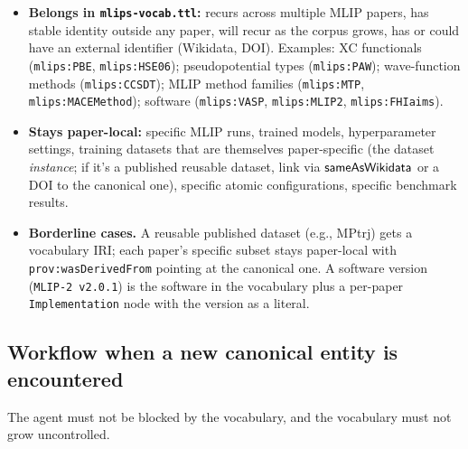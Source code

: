 \begin{itemize}
\item \textbf{Belongs in \texttt{mlips-vocab.ttl}:}
  recurs across multiple MLIP papers, has stable identity outside
  any paper, will recur as the corpus grows, has or could have an
  external identifier (Wikidata, DOI). Examples: XC functionals
  (\texttt{mlips:PBE}, \texttt{mlips:HSE06}); pseudopotential
  types (\texttt{mlips:PAW}); wave-function methods
  (\texttt{mlips:CCSDT}); MLIP method families
  (\texttt{mlips:MTP}, \texttt{mlips:MACEMethod}); software
  (\texttt{mlips:VASP}, \texttt{mlips:MLIP2}, \texttt{mlips:FHIaims}).

\item \textbf{Stays paper-local:}
  specific MLIP runs, trained models, hyperparameter settings,
  training datasets that are themselves paper-specific (the
  dataset \emph{instance}; if it's a published reusable dataset,
  link via $\mathsf{sameAsWikidata}$ or a DOI to the canonical
  one), specific atomic configurations, specific benchmark
  results.

\item \textbf{Borderline cases.}
  A reusable published dataset (e.g., MPtrj) gets a vocabulary
  IRI; each paper's specific subset stays paper-local with
  \texttt{prov:wasDerivedFrom} pointing at the canonical one. A
  software version (\texttt{MLIP-2 v2.0.1}) is the software in
  the vocabulary plus a per-paper \texttt{Implementation} node
  with the version as a literal.
\end{itemize}

\subsection{Workflow when a new canonical entity is encountered}

The agent must not be blocked by the vocabulary, and the vocabulary
must not grow uncontrolled.

